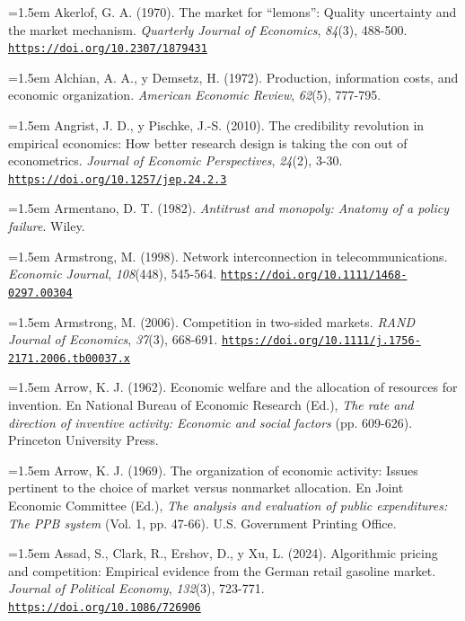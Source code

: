 \documentclass[10pt,a4paper]{article}
\begin{document}
\noindent\hangindent=1.5em Akerlof, G. A. (1970). The market for ``lemons'': Quality uncertainty and the market mechanism. \textit{Quarterly Journal of Economics}, \textit{84}(3), 488-500. \href{https://doi.org/10.2307/1879431}{\nolinkurl{https://doi.org/10.2307/1879431}}

\noindent\hangindent=1.5em Alchian, A. A., y Demsetz, H. (1972). Production, information costs, and economic organization. \textit{American Economic Review}, \textit{62}(5), 777-795.

\noindent\hangindent=1.5em Angrist, J. D., y Pischke, J.-S. (2010). The credibility revolution in empirical economics: How better research design is taking the con out of econometrics. \textit{Journal of Economic Perspectives}, \textit{24}(2), 3-30. \href{https://doi.org/10.1257/jep.24.2.3}{\nolinkurl{https://doi.org/10.1257/jep.24.2.3}}

\noindent\hangindent=1.5em Armentano, D. T. (1982). \textit{Antitrust and monopoly: Anatomy of a policy failure}. Wiley.

\noindent\hangindent=1.5em Armstrong, M. (1998). Network interconnection in telecommunications. \textit{Economic Journal}, \textit{108}(448), 545-564. \href{https://doi.org/10.1111/1468-0297.00304}{\nolinkurl{https://doi.org/10.1111/1468-0297.00304}}

\noindent\hangindent=1.5em Armstrong, M. (2006). Competition in two-sided markets. \textit{RAND Journal of Economics}, \textit{37}(3), 668-691. \href{https://doi.org/10.1111/j.1756-2171.2006.tb00037.x}{\nolinkurl{https://doi.org/10.1111/j.1756-2171.2006.tb00037.x}}

\noindent\hangindent=1.5em Arrow, K. J. (1962). Economic welfare and the allocation of resources for invention. En National Bureau of Economic Research (Ed.), \textit{The rate and direction of inventive activity: Economic and social factors} (pp. 609-626). Princeton University Press.

\noindent\hangindent=1.5em Arrow, K. J. (1969). The organization of economic activity: Issues pertinent to the choice of market versus nonmarket allocation. En Joint Economic Committee (Ed.), \textit{The analysis and evaluation of public expenditures: The PPB system} (Vol. 1, pp. 47-66). U.S. Government Printing Office.

\noindent\hangindent=1.5em Assad, S., Clark, R., Ershov, D., y Xu, L. (2024). Algorithmic pricing and competition: Empirical evidence from the German retail gasoline market. \textit{Journal of Political Economy}, \textit{132}(3), 723-771. \href{https://doi.org/10.1086/726906}{\nolinkurl{https://doi.org/10.1086/726906}}
\end{document}
